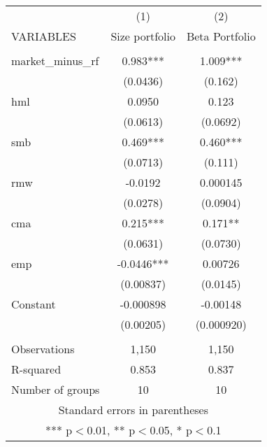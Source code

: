 \begin{tabular}{lcc} \hline
 & (1) & (2) \\
VARIABLES & Size portfolio & Beta Portfolio \\ \hline
 &  &  \\
market\_minus\_rf & 0.983*** & 1.009*** \\
 & (0.0436) & (0.162) \\
hml & 0.0950 & 0.123 \\
 & (0.0613) & (0.0692) \\
smb & 0.469*** & 0.460*** \\
 & (0.0713) & (0.111) \\
rmw & -0.0192 & 0.000145 \\
 & (0.0278) & (0.0904) \\
cma & 0.215*** & 0.171** \\
 & (0.0631) & (0.0730) \\
emp & -0.0446*** & 0.00726 \\
 & (0.00837) & (0.0145) \\
Constant & -0.000898 & -0.00148 \\
 & (0.00205) & (0.000920) \\
 &  &  \\
Observations & 1,150 & 1,150 \\
R-squared & 0.853 & 0.837 \\
 Number of groups & 10 & 10 \\ \hline
\multicolumn{3}{c}{ Standard errors in parentheses} \\
\multicolumn{3}{c}{ *** p$<$0.01, ** p$<$0.05, * p$<$0.1} \\
\end{tabular}
